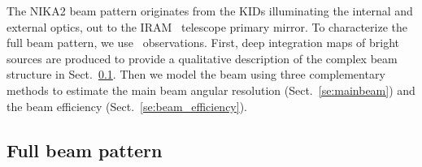 
{\lp The NIKA2 beam pattern originates from the KIDs illuminating the internal
and external optics, out to the IRAM \trentemetre\ telescope primary mirror.}
To characterize the full beam pattern, we use \bm\ observations. First,
deep integration maps of bright sources are produced to provide a
qualitative description of the complex beam structure in
Sect.~\ref{se:fullbeam}. Then we model the beam using three
complementary methods to estimate the main beam angular resolution
(Sect.~\ref{se:mainbeam}) and the beam efficiency
(Sect.~\ref{se:beam_efficiency}).

\subsection{Full beam pattern}
\label{se:fullbeam}


